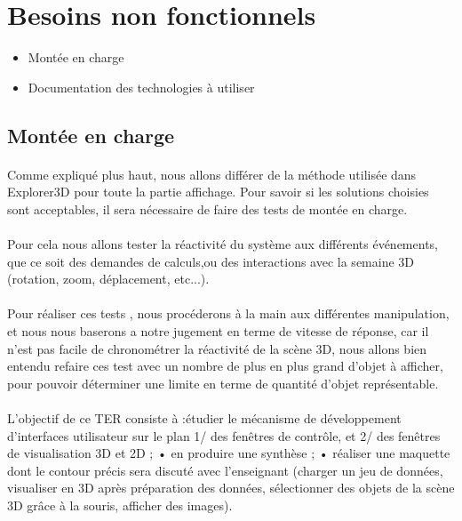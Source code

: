 \section{Besoins non fonctionnels}
\begin{itemize}
\item Montée en charge
\item Documentation des technologies à utiliser
\end{itemize}
\subsection{Montée en charge}
\paragraph{} Comme expliqué plus haut, nous allons différer de la méthode utilisée dans Explorer3D pour toute la partie affichage. Pour savoir si les solutions choisies sont acceptables, il sera nécessaire de faire des tests de montée en charge.

\paragraph{} Pour cela nous allons tester la réactivité du système aux différents événements, que ce soit des demandes de calculs,ou des interactions avec la semaine 3D (rotation, zoom, déplacement, etc...).

\paragraph{} Pour réaliser ces tests , nous procéderons à la main aux différentes manipulation, et nous nous baserons a notre jugement en terme de vitesse de réponse, car il n'est pas facile de chronométrer la réactivité de la scène 3D, nous allons bien entendu refaire ces test avec un nombre de plus en plus grand d'objet à afficher, pour pouvoir déterminer une limite en terme de quantité d'objet représentable.

\paragraph{}
L'objectif de ce TER consiste à :étudier le mécanisme de développement d'interfaces utilisateur sur le plan 1/ des fenêtres de
contrôle, et 2/ des fenêtres de visualisation 3D et 2D ;
• en produire une synthèse ;
• réaliser une maquette dont le contour précis sera discuté avec l'enseignant (charger un jeu de
données, visualiser en 3D après préparation des données, sélectionner des objets de la scène
3D grâce à la souris, afficher des images).

